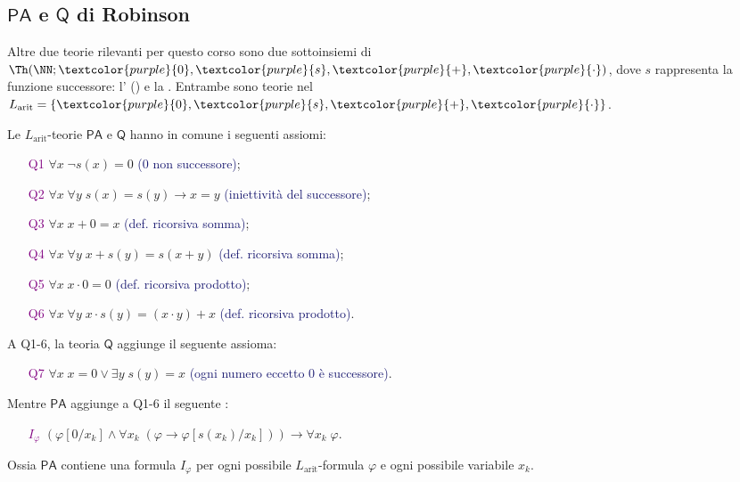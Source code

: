 \subsection{\texorpdfstring{$\mathsf{PA}$ e $\mathsf{Q}$ di Robinson}{PA e Q di Robinson}}
Altre due teorie rilevanti per questo corso sono due sottoinsiemi di \(\Th(\NN;\textcolor{purple}{0},\textcolor{purple}{s},\textcolor{purple}{+},\textcolor{purple}{\cdot})\), dove \(s\) rappresenta la funzione successore:
l' () e la . Entrambe sono teorie nel  $L_{\text{arit}} = \{\textcolor{purple}{0},\textcolor{purple}{s},\textcolor{purple}{+},\textcolor{purple}{\cdot}\}$.

\begin{definition}
    Le $L_{\text{arit}}$-teorie $\mathsf{PA}$ e $\mathsf{Q}$ hanno in comune i seguenti assiomi:
    \begin{itemize}
        \item [\textcolor{purple}{Q1}] $\forall x \; \neg s(x) = 0$ \textcolor{MidnightBlue}{(0 non successore)};
        \item [\textcolor{purple}{Q2}] $\forall x \; \forall y \; s(x) = s(y) \to x = y$ \textcolor{MidnightBlue}{(iniettività del successore)};
        \item [\textcolor{purple}{Q3}] $\forall x \; x + 0 = x$ \textcolor{MidnightBlue}{(def. ricorsiva somma)};
        \item [\textcolor{purple}{Q4}] $\forall x \; \forall y \; x + s(y) = s(x + y)$ \textcolor{MidnightBlue}{(def. ricorsiva somma)};
        \item [\textcolor{purple}{Q5}] $\forall x \; x \cdot 0 = 0$ \textcolor{MidnightBlue}{(def. ricorsiva prodotto)};
        \item [\textcolor{purple}{Q6}] $\forall x \; \forall y \; x \cdot s(y) = (x \cdot y) + x$ \textcolor{MidnightBlue}{(def. ricorsiva prodotto)}.
    \end{itemize}
    A Q1-6, la teoria $\mathsf{Q}$ aggiunge il seguente assioma:
    \begin{itemize}
        \item [\textcolor{purple}{Q7}] $\forall x \; x = 0 \lor \exists y \; s(y) = x$ \textcolor{MidnightBlue}{(ogni numero eccetto 0 è successore)}.
    \end{itemize}
    Mentre $\mathsf{PA}$ aggiunge a Q1-6 il seguente :
    \begin{itemize}
        \item [\textcolor{purple}{$I_\varphi$}] $(\varphi[0/x_k] \land \forall x_k \; (\varphi \to \varphi[s(x_k)/x_k])) \to \forall x_k \; \varphi$.
    \end{itemize}
    Ossia $\mathsf{PA}$ contiene una formula $I_{\varphi}$ per ogni possibile $L_{\text{arit}}$-formula $\varphi$ e ogni possibile variabile $x_k$.
\end{definition}

